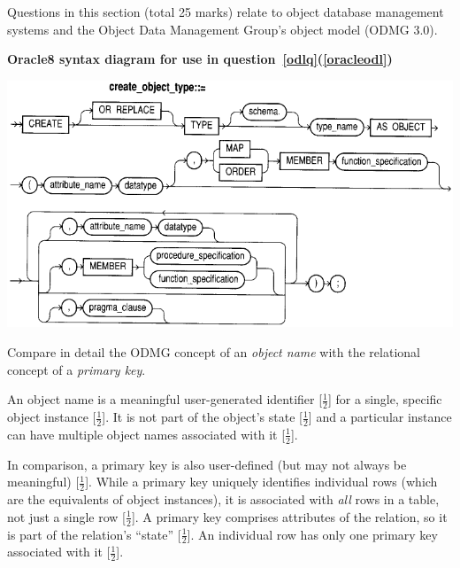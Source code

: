 \begin{examsection}{25}{}{Questions in this section (total 25 marks) relate to object
database management systems and the Object Data Management Group's object model
(ODMG 3.0).}
\newpage

\begin{center}
	\textbf{Oracle8 syntax diagram for use in
	question~\ref{odlq}(\ref{oracleodl})}
	
	\bigskip
	\includegraphics{CreateObjectType}
	\bigskip\bigskip
\end{center}


\begin{question}{15}


	\begin{subquestion}{4}
		Compare in detail the ODMG concept of an \emph{object name} with the
		relational concept of a \emph{primary key}.
		\begin{marking}
			An object name is a meaningful user-generated identifier
			[$\frac{1}{2}$] for a single, specific object instance
			[$\frac{1}{2}$]. It is not part of the object's state
			[$\frac{1}{2}$] and a particular instance can have multiple object
			names associated with it [$\frac{1}{2}$].

			In comparison, a primary key is also user-defined (but may not
			always be meaningful) [$\frac{1}{2}$]. While a primary key uniquely
			identifies individual rows (which are the equivalents of object
			instances), it is associated with \emph{all} rows in a table, not
			just a single row [$\frac{1}{2}$]. A primary key comprises
			attributes of the relation, so it is part of the relation's
			``state'' [$\frac{1}{2}$]. An individual row has only one primary
			key associated with it [$\frac{1}{2}$].
		\end{marking}
	\end{subquestion}
	

\end{question}
\end{examsection}
